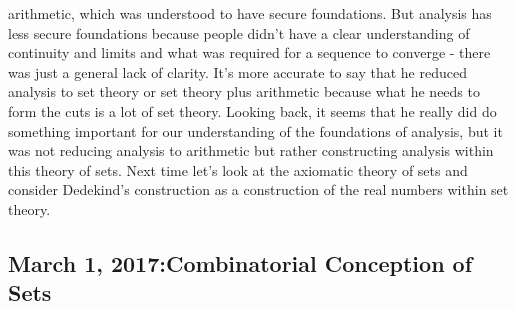 \documentclass[12pt]{article}
\theoremstyle{definition}
\begin{document}
\begin{itemize}
        arithmetic, which was understood to have secure foundations. But
        analysis has less secure foundations because people didn't have a clear
        understanding of continuity and limits and what was required for a
        sequence to converge - there was just a general lack of clarity. It's
        more accurate to say that he reduced analysis to set theory or set
        theory plus arithmetic because what he needs to form the cuts is a lot
        of set theory. Looking back, it seems that he really did do something
        important for our understanding of the foundations of analysis, but it
        was not reducing analysis to arithmetic but rather constructing
        analysis within this theory of sets. Next time let's look at the
        axiomatic theory of sets and consider Dedekind's construction as a
        construction of the real numbers within set theory.

\end{itemize}

\subsection{March 1, 2017:Combinatorial Conception of Sets}
\end{document}
